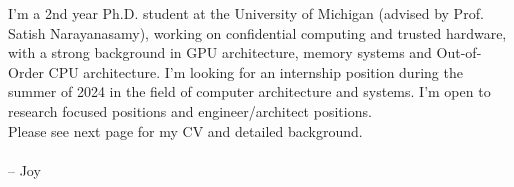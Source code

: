 I'm a 2nd year Ph.D. student at the University of Michigan (advised by Prof. Satish Narayanasamy), working on confidential computing and trusted hardware, with a strong background in GPU architecture, memory systems and Out-of-Order CPU architecture. I'm looking for an internship position during the summer of 2024 in the field of computer architecture and systems. I'm open to research focused positions and engineer/architect positions.  \\

Please see next page for my CV and detailed background. \\
\paragraph*{}
\begin{flushright} -- Joy\end{flushright}

